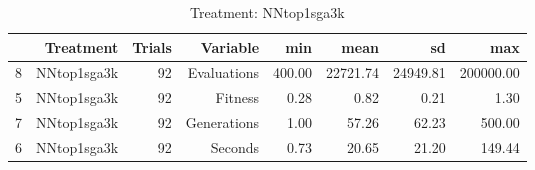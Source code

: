 \begin{table}[ht]
\centering
\begin{tabular}{rrrrrrrr}
  \hline
 & Treatment & Trials & Variable & min & mean & sd & max \\ 
  \hline
8 & NNtop1sga3k &  92 & Evaluations & 400.00 & 22721.74 & 24949.81 & 200000.00 \\ 
  5 & NNtop1sga3k &  92 & Fitness & 0.28 & 0.82 & 0.21 & 1.30 \\ 
  7 & NNtop1sga3k &  92 & Generations & 1.00 & 57.26 & 62.23 & 500.00 \\ 
  6 & NNtop1sga3k &  92 & Seconds & 0.73 & 20.65 & 21.20 & 149.44 \\ 
   \hline
\end{tabular}
\caption{Treatment: NNtop1sga3k} 
\end{table}
